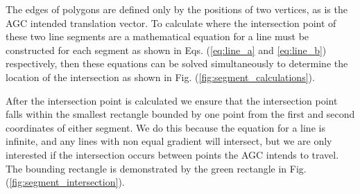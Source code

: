\documentclass[11pt,landscape]{article}
\begin{document}
\begin{multicols}{3}
The edges of polygons are defined only by the positions of two vertices, as is
the AGC intended translation vector. To calculate where the intersection point
of these two line segments are a mathematical equation for a line must be
constructed for each segment as shown in Eqs. (\ref{eq:line_a} and
\ref{eq:line_b}) respectively, then these equations can be solved simultaneously
to determine the location of the intersection as shown in Fig.
(\ref{fig:segment_calculations}).

After the intersection point is calculated we ensure that the intersection point
falls within the smallest rectangle bounded by one point from the first and
second coordinates of either segment. We do this because the equation for a line
is infinite, and any lines with non equal gradient will intersect, but we are
only interested if the intersection occurs between points the AGC intends to
travel. The bounding rectangle is demonstrated by the green rectangle in Fig.
(\ref{fig:segment_intersection}).


\end{multicols}
\end{document}
